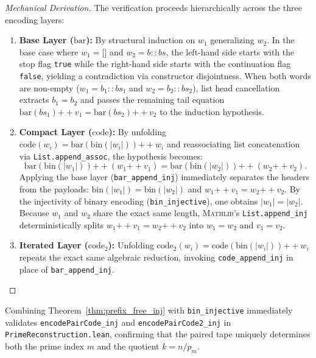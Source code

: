 \documentclass[acmsmall,natbib=false,nonacm]{acmart}
\begin{document}
\begin{proof}[Mechanical Derivation]
The verification proceeds hierarchically across the three encoding layers:
\begin{enumerate}
    \item \textbf{Base Layer ($\text{bar}$):} By structural induction on $w_1$ generalizing $w_2$. In the base case where $w_1 = \texttt{[]}$ and $w_2 = b :: bs$, the left-hand side starts with the stop flag \texttt{true} while the right-hand side starts with the continuation flag \texttt{false}, yielding a contradiction via constructor disjointness. When both words are non-empty ($w_1 = b_1 :: bs_1$ and $w_2 = b_2 :: bs_2$), list head cancellation extracts $b_1 = b_2$ and passes the remaining tail equation $\text{bar}(bs_1) \mathbin{+\!+} v_1 = \text{bar}(bs_2) \mathbin{+\!+} v_2$ to the induction hypothesis.
    
    \item \textbf{Compact Layer ($\text{code}$):} By unfolding $\text{code}(w_i) = \text{bar}(\text{bin}(|w_i|)) \mathbin{+\!+} w_i$ and reassociating list concatenation via \texttt{List.append\_assoc}, the hypothesis becomes:
    \begin{equation*}
        \text{bar}(\text{bin}(|w_1|)) \mathbin{+\!+} (w_1 \mathbin{+\!+} v_1) = \text{bar}(\text{bin}(|w_2|)) \mathbin{+\!+} (w_2 \mathbin{+\!+} v_2).
    \end{equation*}
    Applying the base layer (\texttt{bar\_append\_inj}) immediately separates the headers from the payloads: $\text{bin}(|w_1|) = \text{bin}(|w_2|)$ and $w_1 \mathbin{+\!+} v_1 = w_2 \mathbin{+\!+} v_2$. By the injectivity of binary encoding (\texttt{bin\_injective}), one obtains $|w_1| = |w_2|$. Because $w_1$ and $w_2$ share the exact same length, \textsc{Mathlib}'s \texttt{List.append\_inj} deterministically splits $w_1 \mathbin{+\!+} v_1 = w_2 \mathbin{+\!+} v_2$ into $w_1 = w_2$ and $v_1 = v_2$.
    
    \item \textbf{Iterated Layer ($\text{code}_2$):} Unfolding $\text{code}_2(w_i) = \text{code}(\text{bin}(|w_i|)) \mathbin{+\!+} w_i$ repeats the exact same algebraic reduction, invoking \texttt{code\_append\_inj} in place of \texttt{bar\_append\_inj}.
\end{enumerate}
\end{proof}

Combining Theorem~\ref{thm:prefix_free_inj} with \texttt{bin\_injective} immediately validates \texttt{encodePairCode\_inj} and \texttt{encodePairCode2\_inj} in \texttt{PrimeReconstruction.lean}, confirming that the paired tape uniquely determines both the prime index $m$ and the quotient $k = n / p_m$.
\end{document}
